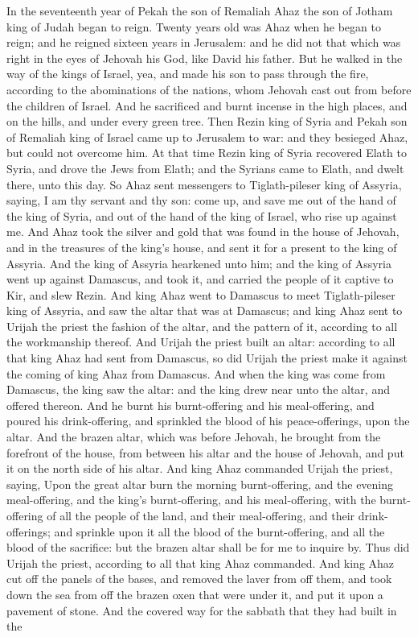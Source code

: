 In the seventeenth year of Pekah the son of Remaliah Ahaz the son of Jotham king of Judah began to reign. Twenty years old was Ahaz when he began to reign; and he reigned sixteen years in Jerusalem: and he did not that which was right in the eyes of Jehovah his God, like David his father. But he walked in the way of the kings of Israel, yea, and made his son to pass through the fire, according to the abominations of the nations, whom Jehovah cast out from before the children of Israel. And he sacrificed and burnt incense in the high places, and on the hills, and under every green tree.  Then Rezin king of Syria and Pekah son of Remaliah king of Israel came up to Jerusalem to war: and they besieged Ahaz, but could not overcome him. At that time Rezin king of Syria recovered Elath to Syria, and drove the Jews from Elath; and the Syrians came to Elath, and dwelt there, unto this day.  So Ahaz sent messengers to Tiglath-pileser king of Assyria, saying, I am thy servant and thy son: come up, and save me out of the hand of the king of Syria, and out of the hand of the king of Israel, who rise up against me. And Ahaz took the silver and gold that was found in the house of Jehovah, and in the treasures of the king’s house, and sent it for a present to the king of Assyria. And the king of Assyria hearkened unto him; and the king of Assyria went up against Damascus, and took it, and carried the people of it captive to Kir, and slew Rezin.  And king Ahaz went to Damascus to meet Tiglath-pileser king of Assyria, and saw the altar that was at Damascus; and king Ahaz sent to Urijah the priest the fashion of the altar, and the pattern of it, according to all the workmanship thereof. And Urijah the priest built an altar: according to all that king Ahaz had sent from Damascus, so did Urijah the priest make it against the coming of king Ahaz from Damascus. And when the king was come from Damascus, the king saw the altar: and the king drew near unto the altar, and offered thereon. And he burnt his burnt-offering and his meal-offering, and poured his drink-offering, and sprinkled the blood of his peace-offerings, upon the altar. And the brazen altar, which was before Jehovah, he brought from the forefront of the house, from between his altar and the house of Jehovah, and put it on the north side of his altar. And king Ahaz commanded Urijah the priest, saying, Upon the great altar burn the morning burnt-offering, and the evening meal-offering, and the king’s burnt-offering, and his meal-offering, with the burnt-offering of all the people of the land, and their meal-offering, and their drink-offerings; and sprinkle upon it all the blood of the burnt-offering, and all the blood of the sacrifice: but the brazen altar shall be for me to inquire by. Thus did Urijah the priest, according to all that king Ahaz commanded.  And king Ahaz cut off the panels of the bases, and removed the laver from off them, and took down the sea from off the brazen oxen that were under it, and put it upon a pavement of stone. And the covered way for the sabbath that they had built in the 